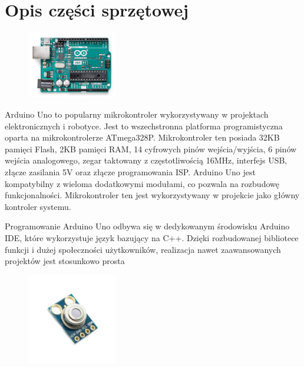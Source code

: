 \chapter{Opis części sprzętowej}

    \begin{figure}[h!]
        \centering
        \includegraphics[width=0.35\textwidth]{images/uno.jpg}
        \label{fig:example}
    \end{figure}

    Arduino Uno to popularny mikrokontroler wykorzystywany w projektach elektronicznych i robotyce. Jest to wszechstronna platforma programistyczna oparta na mikrokontrolerze ATmega328P. Mikrokontroler ten posiada 32KB pamięci Flash, 2KB pamięci RAM, 14 cyfrowych pinów wejścia/wyjścia, 6 pinów wejścia analogowego, zegar taktowany z częstotliwością 16MHz, interfejs USB, złącze zasilania 5V oraz złącze programowania ISP. Arduino Uno jest kompatybilny z wieloma dodatkowymi modułami, co pozwala na rozbudowę funkcjonalności. Mikrokontroler ten jest wykorzystywany w projekcie jako główny kontroler systemu.

    \vspace{12pt}

    Programowanie Arduino Uno odbywa się w dedykowanym środowisku Arduino IDE, które wykorzystuje język bazujący na C++. Dzięki rozbudowanej bibliotece funkcji i dużej społeczności użytkowników, realizacja nawet zaawansowanych projektów jest stosunkowo prosta \cite{4}
    

    \begin{figure}[h!]
        \centering
        \includegraphics[width=0.35\textwidth]{images/mlx.jpg}
        \label{fig:example}
    \end{figure}

